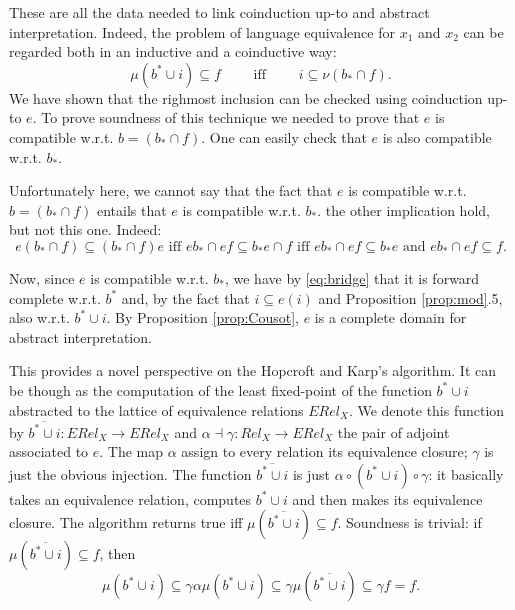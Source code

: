 \documentclass{llncs}
\begin{document}
These are all the data needed to link coinduction up-to and abstract interpretation.
Indeed, the problem of language equivalence for $x_1$ and $x_2$ can be regarded both in an inductive and a coinductive way:
$$ \mu (b^*\cup i ) \subseteq  f \qquad  \text{ iff }\qquad i \subseteq \nu (b_*\cap f)\text{.}$$ 
We have shown that the righmost inclusion can be checked using coinduction up-to $e$. To prove soundness of this technique we needed to prove that $e$ is compatible w.r.t. $b=(b_*\cap f)$. One can easily check that $e$ is also compatible w.r.t. $b_*$.

\begin{remark}
Unfortunately here, we cannot say that the fact that $e$ is compatible w.r.t. $b=(b_*\cap f)$ entails that $e$ is compatible w.r.t. $b_*$. the other implication hold, but not this one. Indeed: 
$$e(b_*\cap f) \subseteq (b_*\cap f) e \text{ iff } eb_* \cap ef \subseteq b_* e \cap f \text{ iff }  eb_* \cap ef \subseteq b_* e \text{ and }  eb_* \cap ef \subseteq  f\text{.}$$
\end{remark}

Now, since $e$ is compatible w.r.t. $b_*$, we have by \eqref{eq:bridge} that it is forward complete w.r.t. $b^*$ and, by the fact that $i\subseteq e(i)$ and Proposition \ref{prop:mod}.5, also w.r.t. $b^*\cup i$. By Proposition \ref{prop:Cousot}, $e$ is a complete domain for abstract interpretation. 

This provides a novel perspective on the Hopcroft and Karp's algorithm. It can be though as the computation of the least fixed-point  of the function $b^*\cup i$ abstracted to the lattice of equivalence relations $ERel_X$. We denote this function by $\overline{b^*\cup i}\colon ERel_X \to ERel_X$ and $\alpha \dashv \gamma \colon Rel_X \to ERel_X$ the pair of adjoint associated to $e$. The map $\alpha$ assign to every relation its equivalence closure; $\gamma$ is just the obvious injection. The function $\overline{b^*\cup i}$ is just $\alpha \circ (b^*\cup i) \circ \gamma$: it basically takes an equivalence relation, computes $b^*\cup i$ and then makes its equivalence closure. The algorithm returns true iff $\mu (\overline{b^*\cup i}) \subseteq f$. Soundness is trivial: if $\mu (\overline{b^*\cup i})  \subseteq f$, then $$\mu (b^*\cup i) \subseteq \gamma \alpha \mu (b^*\cup i) \subseteq \gamma \mu (\overline{b^*\cup i}) \subseteq \gamma  f =f\text{.}$$
\end{document}
